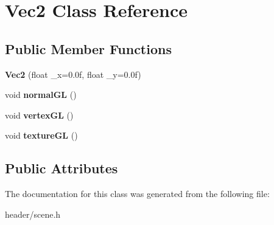 \hypertarget{classVec2}{
\section{Vec2 Class Reference}
\label{classVec2}
}
\subsection*{Public Member Functions}
\begin{DoxyCompactItemize}
\item 
\hypertarget{classVec2_addf77f8281c06fef569e3d7d1229845c}{
{\bfseries Vec2} (float \_\-x=0.0f, float \_\-y=0.0f)}
\label{classVec2_addf77f8281c06fef569e3d7d1229845c}

\item 
\hypertarget{classVec2_a5fa1e44f966056513a79911d3ab3ffc7}{
void {\bfseries normalGL} ()}
\label{classVec2_a5fa1e44f966056513a79911d3ab3ffc7}

\item 
\hypertarget{classVec2_a85cbd1726a91543640dad27f77f8f40c}{
void {\bfseries vertexGL} ()}
\label{classVec2_a85cbd1726a91543640dad27f77f8f40c}

\item 
\hypertarget{classVec2_a9a3474696f00704013234203a2946607}{
void {\bfseries textureGL} ()}
\label{classVec2_a9a3474696f00704013234203a2946607}

\end{DoxyCompactItemize}
\subsection*{Public Attributes}


The documentation for this class was generated from the following file:\begin{DoxyCompactItemize}
\item 
header/scene.h\end{DoxyCompactItemize}
